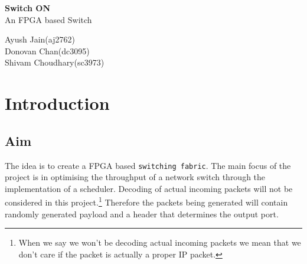 \documentclass[twoside,12pt,fleqn]{book} %
\begin{document}

\begingroup
\thispagestyle{empty}
\centering
\vspace*{5cm}
\par\normalfont\fontsize{35}{35}\sffamily\selectfont
\textbf{Switch ON}\\
{\LARGE An FPGA based Switch}\par %
\vspace*{1cm}
{\Huge Ayush Jain(aj2762)\\ Donovan Chan(dc3095)\\ Shivam Choudhary(sc3973)}\par %
\endgroup

\newpage
\let\cleardoublepage\clearpage
{} %

\pagestyle{empty} %

\tableofcontents %
\pagestyle{fancy} %


\chapter{Introduction}

\section{Aim} 
\justify
The idea is to create a FPGA based \texttt {switching fabric}. The main focus of the project is in optimising the throughput of a network switch through the implementation of a scheduler. Decoding of actual incoming packets will not be considered in this project.\footnote{When we say we won't be decoding actual incoming packets we mean that we don't care if the packet is actually a proper IP packet.} Therefore the packets being generated will contain randomly generated payload and a header that determines the output port.
\end{document}
